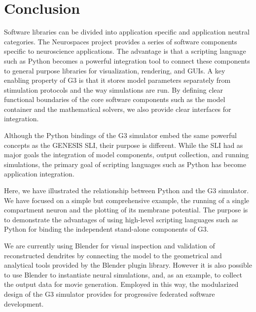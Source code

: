 \documentclass[12pt]{article}
\begin{document}
\vspace*{-4mm}
\section{Conclusion}

Software libraries can be divided into application specific and
application neutral categories.  The Neurospaces project provides a
series of software components specific to neuroscience applications.
The advantage is that a scripting language such as Python becomes a
powerful integration tool to connect these components to general
purpose libraries for visualization, rendering, and GUIs.  A key
enabling property of G3 is that it stores model parameters separately
from stimulation protocols and the way simulations are run.  By
defining clear functional boundaries of the core software components
such as the model container and the mathematical solvers, we also
provide clear interfaces for integration.

Although the Python bindings of the G3 simulator embed the same
powerful concepts as the GENESIS SLI, their purpose is different.
While the SLI had as major goals the integration of model components,
output collection, and running simulations, the primary goal of
scripting languages such as Python has become application integration.

Here, we have illustrated the relationship between Python and the G3
simulator.  We have focused on a simple but comprehensive example, the
running of a single compartment neuron and the plotting of its
membrane potential. The purpose is to demonstrate the advantages of
using high-level scripting languages such as Python for binding the
independent stand-alone components of G3.


We are currently using Blender for visual inspection and validation of
reconstructed dendrites by connecting the model to the geometrical and
analytical tools provided by the Blender plugin library.  However it
is also possible to use Blender to instantiate neural simulations,
and, as an example, to collect the output data for movie generation.
Employed in this way, the modularized design of the G3 simulator
provides for progressive federated software development.
\end{document}
